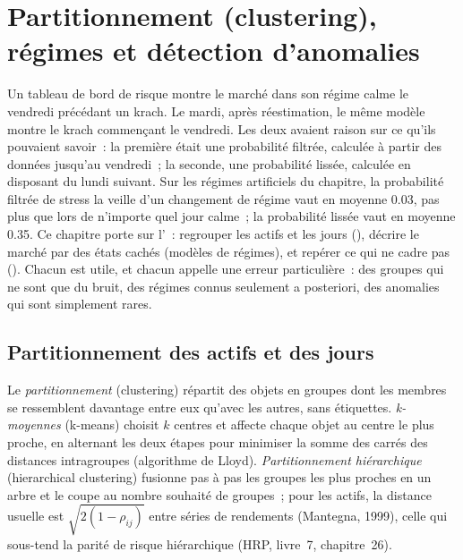 \chapter{Partitionnement (clustering), régimes et détection d'anomalies}\label{ch:ml:clustering-regimes-and-anomaly-detection}

Un tableau de bord de risque montre le marché dans son régime calme le vendredi précédant un krach. Le mardi, après réestimation, le même modèle montre
le krach commençant le vendredi. Les deux avaient raison sur ce qu'ils pouvaient savoir~: la première était une probabilité filtrée, calculée
à partir des données jusqu'au vendredi~; la seconde, une probabilité lissée, calculée en disposant du lundi suivant. Sur les régimes artificiels du chapitre, la
probabilité filtrée de stress la veille d'un changement de régime vaut en moyenne 0.03, pas plus que lors de n'importe quel jour calme~; la probabilité lissée
vaut en moyenne 0.35. Ce chapitre porte sur l'~: regrouper les actifs et les jours (), décrire le marché
par des états cachés (modèles de régimes), et repérer ce qui ne cadre pas (). Chacun est utile, et chacun appelle une
erreur particulière~: des groupes qui ne sont que du bruit, des régimes connus seulement a posteriori, des anomalies qui sont simplement rares.

\section{Partitionnement des actifs et des jours}

\begin{definition}\label{def:ml:clustering-regimes-and-anomaly-detection:cluster}
Le \emph{partitionnement} (clustering) répartit des objets en groupes dont les membres se ressemblent davantage entre eux qu'avec
les autres, sans étiquettes. \emph{k-moyennes} (k-means) choisit $k$ centres et affecte chaque objet au centre le plus proche, en alternant
les deux étapes pour minimiser la somme des carrés des distances intragroupes (algorithme de Lloyd). \emph{Partitionnement
hiérarchique} (hierarchical clustering) fusionne pas à pas les groupes les plus proches en un arbre et le coupe au nombre souhaité
de groupes~; pour les actifs, la distance usuelle est $\sqrt{2(1-\rho_{ij})}$ entre séries de rendements (Mantegna, 1999), celle qui sous-tend
la parité de risque hiérarchique (HRP, livre~7, chapitre~26).
\end{definition}

